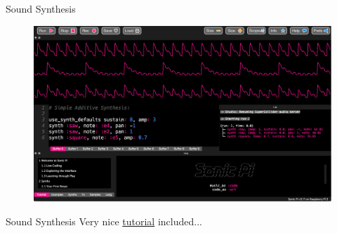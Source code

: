 \documentclass{beamer}
\begin{document}
\begin{frame}{Sound Synthesis}
    \begin{figure}[h]
        \includegraphics[width=\textwidth]{sonicpi_screenshot.png}
    \end{figure}
\end{frame}

\begin{frame}{Sound Synthesis}
    Very nice \href{https://sonic-pi.net/tutorial.html}{tutorial} included...
\end{frame}


\end{document}
